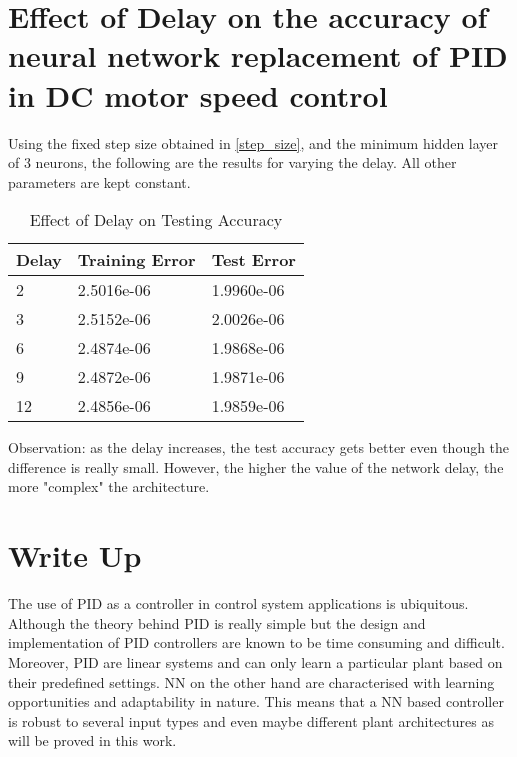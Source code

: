 \documentclass{article}
\begin{document}
\section{Effect of Delay on the accuracy of neural network replacement of PID in DC motor speed control}
Using the fixed step size obtained in \ref{step_size}, and the minimum hidden layer of 3 neurons, the following are the results for varying the delay. All other parameters are kept constant.
\begin{table}[H]
\centering
\caption{\label{tab3}Effect of Delay on  Testing Accuracy}
\begin{tabular}{|l|l|l|}
\hline
Delay & Training Error & Test Error \\ \hline
2     & 2.5016e-06     & 1.9960e-06 \\ \hline
3     & 2.5152e-06     & 2.0026e-06 \\ \hline
6     & 2.4874e-06     & 1.9868e-06 \\ \hline
9     & 2.4872e-06     & 1.9871e-06 \\ \hline
12    & 2.4856e-06     & 1.9859e-06 \\ \hline
\end{tabular}
\end{table}
Observation: as the delay increases, the test accuracy gets better even though the difference is really small. However, the higher the value of the network delay, the more "complex" the architecture.

\section{Write Up}
The use of PID as a controller in control system applications is ubiquitous. Although the theory behind PID is really simple but the design and implementation of PID controllers are known to be time consuming and difficult. Moreover, PID are linear systems and can only learn a particular plant based on their predefined settings. NN on the other hand are characterised with learning opportunities and adaptability in nature. This means that a NN based controller is robust to several input types and even maybe different plant architectures as will be proved in this work.
\end{document}
